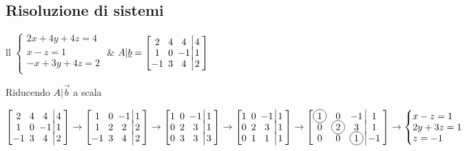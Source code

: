 \subsection{Risoluzione di sistemi}
\begin{tabular}{ll}
	\(
		\begin{cases}
			2x+4y+4z=4 \\[-0.3em]
			x-z=1 \\[-0.3em]
			-x+3y+4z=2 \\
		\end{cases}
	\)
	&
	\(
	A|\vec{b} = \left[
	\arraycolsep=2.5pt\def\arraystretch{1.2}
	\begin{array}{@{}ccc|c}
		2 & 4 & 4 & 4 \\[-0.3em]
		1 & 0 & -1 & 1 \\[-0.3em]
		-1 & 3 & 4 & 2 \\
	\end{array}
	\right]
	\)
\end{tabular}

Riducendo $A|\vec{b}$ a scala

\(
\left[
	\arraycolsep=2.5pt\def\arraystretch{1.2}
	\begin{array}{@{}ccc|c}
		2 & 4 & 4 & 4 \\[-0.3em]
		1 & 0 & -1 & 1 \\[-0.3em]
		-1 & 3 & 4 & 2 \\
	\end{array}
\right]
\rightarrow
\left[
	\arraycolsep=2.5pt\def\arraystretch{1.2}
	\begin{array}{@{}ccc|c}
		1 & 0 & -1 & 1 \\[-0.3em]
		1 & 2 & 2 & 2 \\[-0.3em]
		-1 & 3 & 4 & 2 \\
	\end{array}
\right]
\rightarrow
\left[
	\arraycolsep=2.5pt\def\arraystretch{1.2}
	\begin{array}{@{}ccc|c}
		1 & 0 & -1 & 1 \\[-0.3em]
		0 & 2 & 3 & 1 \\[-0.3em]
		0 & 3 & 3 & 3 \\
	\end{array}
\right]
\rightarrow
\left[
	\arraycolsep=2.5pt\def\arraystretch{1.2}
	\begin{array}{@{}ccc|c}
		1 & 0 & -1 & 1 \\[-0.3em]
		0 & 2 & 3 & 1 \\[-0.3em]
		0 & 1 & 1 & 1 \\
	\end{array}
\right]
\rightarrow
\left[
	\arraycolsep=2.5pt\def\arraystretch{1.2}
	\begin{array}{@{}ccc|c}
		\circled{1} & 0 & -1 & 1 \\[-0.3em]
		0 & \circled{2} & 3 & 1 \\[-0.3em]
		0 & 0 & \circled{1} & -1 \\
	\end{array}
\right]
\rightarrow
\begin{cases}
	x - z = 1 \\[-0.3em]
	2y + 3z = 1 \\[-0.3em]
	z = -1 \\
\end{cases}
\)